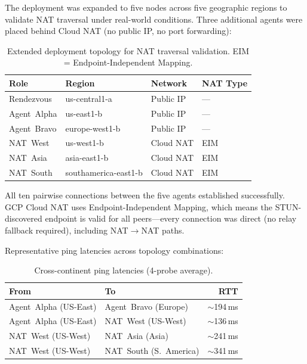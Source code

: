 \documentclass[11pt,a4paper]{article}
\begin{document}
The deployment was expanded to five nodes across five geographic regions to validate NAT traversal under real-world conditions. Three additional agents were placed behind Cloud NAT (no public IP, no port forwarding):

\begin{table}[h]
\centering
\begin{tabular}{@{}llll@{}}
\toprule
\textbf{Role} & \textbf{Region} & \textbf{Network} & \textbf{NAT Type} \\
\midrule
Rendezvous     & us-central1-a      & Public IP          & --- \\
Agent~Alpha    & us-east1-b         & Public IP          & --- \\
Agent~Bravo    & europe-west1-b     & Public IP          & --- \\
NAT~West       & us-west1-b         & Cloud NAT          & EIM \\
NAT~Asia       & asia-east1-b       & Cloud NAT          & EIM \\
NAT~South      & southamerica-east1-b & Cloud NAT        & EIM \\
\bottomrule
\end{tabular}
\caption{Extended deployment topology for NAT traversal validation. EIM = Endpoint-Independent Mapping.}
\label{tab:nat-deployment}
\end{table}

All ten pairwise connections between the five agents established successfully. GCP Cloud NAT uses Endpoint-Independent Mapping, which means the STUN-discovered endpoint is valid for all peers---every connection was direct (no relay fallback required), including NAT$\rightarrow$NAT paths.

Representative ping latencies across topology combinations:

\begin{table}[h]
\centering
\begin{tabular}{@{}llr@{}}
\toprule
\textbf{From} & \textbf{To} & \textbf{RTT} \\
\midrule
Agent~Alpha (US-East)  & Agent~Bravo (Europe)  & ${\sim}$194\,ms \\
Agent~Alpha (US-East)  & NAT~West (US-West)    & ${\sim}$136\,ms \\
NAT~West (US-West)     & NAT~Asia (Asia)       & ${\sim}$241\,ms \\
NAT~West (US-West)     & NAT~South (S.~America) & ${\sim}$341\,ms \\
\bottomrule
\end{tabular}
\caption{Cross-continent ping latencies (4-probe average).}
\label{tab:nat-latency}
\end{table}
\end{document}
